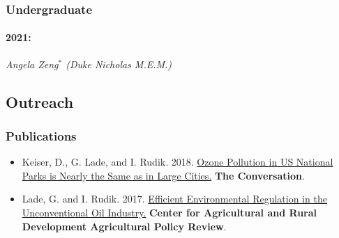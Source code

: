 \documentclass[12pt]{res} %
\begin{document}
\begin{resume}
\vspace{-.2in}

\subsubsection{Undergraduate}\vspace{-.2in}
\paragraph{2021:} \textit{Angela Zeng$^*$  (Duke Nicholas M.E.M.)}

\vspace{-.2in}

\subsection{Outreach}

\vspace{-.2in}

\subsubsection{Publications}
\begin{itemize} %
	\item[] Keiser, D., G. Lade, and I. Rudik. 2018. \href{https://theconversation.com/ozone-pollution-in-us-national-parks-is-nearly-the-same-as-in-large-cities-100148}{Ozone Pollution in US National Parks is Nearly the Same as in Large Cities.} \textbf{The Conversation}.
	\item[] Lade, G. and I. Rudik. 2017. \href{https://www.card.iastate.edu/ag_policy_review/display.aspx?id=70}{Efficient Environmental Regulation in the Unconventional Oil Industry.} \textbf{Center for Agricultural and Rural Development Agricultural Policy Review}.
\end{itemize}


\end{resume}
\end{document}
